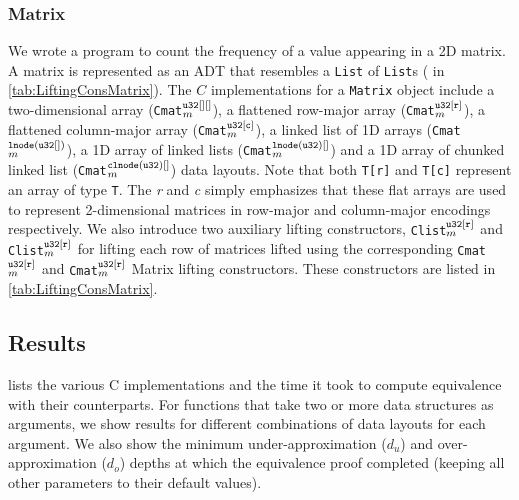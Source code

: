 \subsubsection{Matrix} We wrote a
\SpecL{} program to count the frequency of a value appearing in a 2D matrix.
A matrix is represented as an ADT that resembles a {\tt List} of {\tt List}s ( in \cref{tab:LiftingConsMatrix}).
The $C$ implementations for a {\tt Matrix} object include
a two-dimensional array ({\tt Cmat}$^{\tt u32[][]}_m$), a flattened row-major array ({\tt Cmat}$^{\tt u32[r]}_m$),
a flattened column-major array ({\tt Cmat}$^{\tt u32[c]}_m$), a linked list of 1D arrays ({\tt Cmat}$^{\tt lnode(u32[])}_m$),
a 1D array of linked lists ({\tt Cmat}$^{\tt lnode(u32)[]}_m$) and a 1D array of chunked linked list ({\tt Cmat}$^{\tt clnode(u32)[]}_m$)
data layouts. Note that both {\tt T[r]} and {\tt T[c]} represent an array of type {\tt T}. The {\em r} and {\em c} simply
emphasizes that these flat arrays are used to represent 2-dimensional matrices in row-major and column-major encodings
respectively. We also introduce two auxiliary lifting constructors, {\tt Clist}$_m^{\tt u32[r]}$ and {\tt Clist}$_m^{\tt u32[r]}$
for lifting each row of matrices lifted using the corresponding {\tt Cmat}$_m^{\tt u32[r]}$ and {\tt Cmat}$_m^{\tt u32[r]}$ Matrix lifting
constructors. These constructors are listed in \cref{tab:LiftingConsMatrix}.



\subsection{Results}
 lists the various C implementations and the time it took
to compute equivalence with their \SpecL{} counterparts. For functions that
take two or more data structures as arguments, we show
results for different combinations of data layouts for each argument.
We also show the minimum under-approximation ($d_u$) and over-approximation ($d_o$) depths
at which the equivalence proof completed (keeping all other parameters to their
default values).

